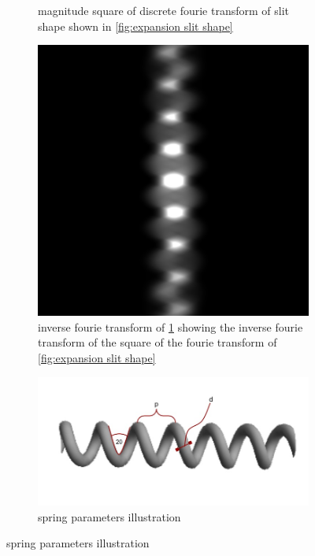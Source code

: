 \begin{figure}[H]
\begin{subfigure}{0.48\columnwidth}
        \caption{magnitude square of discrete fourie transform of slit shape shown in \ref{fig:expansion slit shape}}
        \label{fig:expansion interference simulation}
    \end{subfigure}
    \begin{subfigure}{0.48\columnwidth}
        \centering
        \includegraphics[width=\columnwidth]{figures/reverse fourie transform.png}
        \caption{inverse fourie transform of \ref{fig:expansion interference simulation} showing
        the inverse fourie transform of the square of the fourie transform of \ref{fig:expansion slit shape}}
        \label{fig:expansion inverse fourie transform}
    \end{subfigure}
    \begin{subfigure}{0.48\columnwidth}
        \centering
        \includegraphics[width=\columnwidth]{figures/spring parameters illustration.jpg}
        \caption{spring parameters illustration}
        \label{fig:spring parameters illustration}
    \end{subfigure}

    \label{fig:expansion theory illustrations}
\end{figure}
